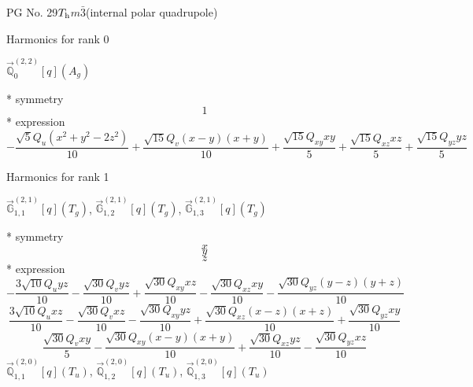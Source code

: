 \documentclass[fleqn,8pt]{jsarticle}
\begin{document}
\setcounter{MaxMatrixCols}{32}

\renewcommand{\tablename}{Table~}
\renewcommand{\figurename}{Figure~}
\begin{center}
\LARGE
PG No. 29\quad$T_{\rm h}$\quad$m\bar{3}$\quad[ cubic ] (internal polar quadrupole)
\end{center}

\noindent * Harmonics for rank 0

\noindent\quad $\vec{\mathbb{Q}}_{0}^{(2,2)}[q](A_{g})$

\noindent\quad ** symmetry
\begin{dmath*}
1
\end{dmath*}
\noindent\quad ** expression
\begin{dmath*}
- \frac{\sqrt{5} Q_{u} \left(x^{2} + y^{2} - 2 z^{2}\right)}{10} + \frac{\sqrt{15} Q_{v} \left(x - y\right) \left(x + y\right)}{10} + \frac{\sqrt{15} Q_{xy} x y}{5} + \frac{\sqrt{15} Q_{xz} x z}{5} + \frac{\sqrt{15} Q_{yz} y z}{5}
\end{dmath*}

\noindent * Harmonics for rank 1

\noindent\quad $\vec{\mathbb{G}}_{1,1}^{(2,1)}[q](T_{g})$, $\vec{\mathbb{G}}_{1,2}^{(2,1)}[q](T_{g})$, $\vec{\mathbb{G}}_{1,3}^{(2,1)}[q](T_{g})$

\noindent\quad ** symmetry
\begin{dmath*}
x
\end{dmath*}
\begin{dmath*}
y
\end{dmath*}
\begin{dmath*}
z
\end{dmath*}
\noindent\quad ** expression
\begin{dmath*}
- \frac{3 \sqrt{10} Q_{u} y z}{10} - \frac{\sqrt{30} Q_{v} y z}{10} + \frac{\sqrt{30} Q_{xy} x z}{10} - \frac{\sqrt{30} Q_{xz} x y}{10} - \frac{\sqrt{30} Q_{yz} \left(y - z\right) \left(y + z\right)}{10}
\end{dmath*}
\begin{dmath*}
\frac{3 \sqrt{10} Q_{u} x z}{10} - \frac{\sqrt{30} Q_{v} x z}{10} - \frac{\sqrt{30} Q_{xy} y z}{10} + \frac{\sqrt{30} Q_{xz} \left(x - z\right) \left(x + z\right)}{10} + \frac{\sqrt{30} Q_{yz} x y}{10}
\end{dmath*}
\begin{dmath*}
\frac{\sqrt{30} Q_{v} x y}{5} - \frac{\sqrt{30} Q_{xy} \left(x - y\right) \left(x + y\right)}{10} + \frac{\sqrt{30} Q_{xz} y z}{10} - \frac{\sqrt{30} Q_{yz} x z}{10}
\end{dmath*}
\noindent\quad $\vec{\mathbb{Q}}_{1,1}^{(2,0)}[q](T_{u})$, $\vec{\mathbb{Q}}_{1,2}^{(2,0)}[q](T_{u})$, $\vec{\mathbb{Q}}_{1,3}^{(2,0)}[q](T_{u})$
\end{document}
